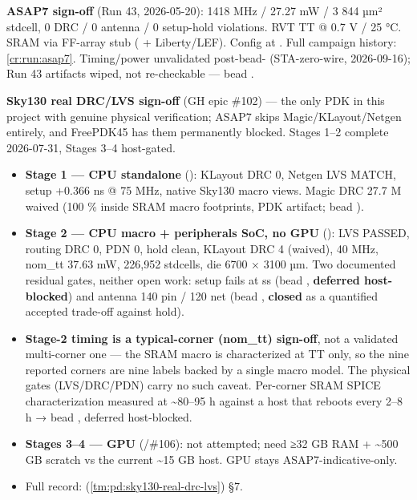 \begin{record}
\textbf{ASAP7 sign-off} \ok{} (Run 43, 2026-05-20): 1418 MHz / 27.27 mW
/ 3 844 µm² stdcell, 0 DRC / 0 antenna / 0 setup-hold violations. RVT TT
@ 0.7 V / 25 °C. SRAM via FF-array stub
( + Liberty/\allowbreak{}LEF). Config
at . Full campaign history:
\cref{cr:run:asap7}. \warn{} Timing/\allowbreak{}power
unvalidated post-bead- (STA-zero-wire, 2026-09-16); Run 43
artifacts wiped, not re-checkable --- bead .

\textbf{Sky130 real DRC/LVS sign-off} (GH epic \#102) --- the only PDK
in this project with genuine physical verification; ASAP7 skips
Magic/\allowbreak{}KLayout/\allowbreak{}Netgen entirely, and FreePDK45
has them permanently blocked. Stages 1--2 \ok{} complete 2026-07-31,
Stages 3--4 \hold{} host-gated.

\begin{itemize}
\tightlist
\item
  \textbf{Stage 1 --- CPU standalone} (): KLayout DRC 0, Netgen
  LVS MATCH, setup +0.366 ns @ 75 MHz, native Sky130 macro views. Magic
  DRC 27.7 M waived (100 \% inside SRAM macro footprints, PDK artifact;
  bead ).
\item
  \textbf{Stage 2 --- CPU macro + peripherals SoC, no GPU} ():
  LVS PASSED, routing DRC 0, PDN 0, hold clean, KLayout DRC 4 (waived),
  40 MHz, nom\_tt 37.63 mW, 226,952 stdcells, die 6700 × 3100 µm. Two
  documented residual gates, neither open work: setup fails at ss (bead
  , \textbf{deferred host-blocked}) and antenna 140 pin / 120
  net (bead , \textbf{closed} as a quantified accepted
  trade-off against hold).
\item
  \warn{} \textbf{Stage-2 timing is a typical-corner (nom\_tt)
  sign-off}, not a validated multi-corner one --- the SRAM macro is
  characterized at TT only, so the nine reported corners are nine labels
  backed by a single macro model. The physical gates
  (LVS/\allowbreak{}DRC/\allowbreak{}PDN) carry no such caveat.
  Per-corner SRAM SPICE characterization measured at
  \textasciitilde80--95 h against a host that reboots every 2--8 h →
  bead , deferred host-blocked.
\item
  \textbf{Stages 3--4 --- GPU} (/\allowbreak{}\#106): not
  attempted; need ≥32 GB RAM + \textasciitilde500 GB scratch vs the
  current \textasciitilde15 GB host. GPU stays ASAP7-indicative-only.
\item
  Full record:  (\cref{tm:pd:sky130-real-drc-lvs}) §7.
\end{itemize}

\end{record}

